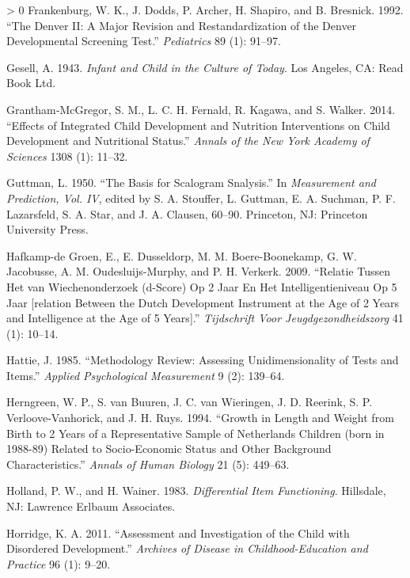 \documentclass[
]{book}
\newlength{\cslhangindent}
\newenvironment{CSLReferences}[3] %
 {%
  \setlength{\parindent}{0pt}
  \ifodd #1 \everypar{\setlength{\hangindent}{\cslhangindent}}\ignorespaces\fi
  \ifnum #2 > 0
  \setlength{\parskip}{#2\baselineskip}
  \fi
 }%
 {}
\begin{document}
\begin{CSLReferences}{1}{0}
\leavevmode\hypertarget{ref-frankenburg1992}{}%
Frankenburg, W. K., J. Dodds, P. Archer, H. Shapiro, and B. Bresnick. 1992. {``The Denver II: A Major Revision and Restandardization of the Denver Developmental Screening Test.''} \emph{Pediatrics} 89 (1): 91--97.

\leavevmode\hypertarget{ref-gesell1943}{}%
Gesell, A. 1943. \emph{Infant and Child in the Culture of Today}. Los Angeles, CA: Read Book Ltd.

\leavevmode\hypertarget{ref-grantham2014}{}%
Grantham‐McGregor, S. M., L. C. H. Fernald, R. Kagawa, and S. Walker. 2014. {``Effects of Integrated Child Development and Nutrition Interventions on Child Development and Nutritional Status.''} \emph{Annals of the New York Academy of Sciences} 1308 (1): 11--32.

\leavevmode\hypertarget{ref-guttman1950}{}%
Guttman, L. 1950. {``The Basis for Scalogram Snalysis.''} In \emph{Measurement and Prediction, Vol. IV}, edited by S. A. Stouffer, L. Guttman, E. A. Suchman, P. F. Lazarsfeld, S. A. Star, and J. A. Clausen, 60--90. Princeton, NJ: Princeton University Press.

\leavevmode\hypertarget{ref-hafkamp2009}{}%
Hafkamp-de Groen, E., E. Dusseldorp, M. M. Boere-Boonekamp, G. W. Jacobusse, A. M. Oudesluijs-Murphy, and P. H. Verkerk. 2009. {``Relatie Tussen Het van Wiechenonderzoek (d-Score) Op 2 Jaar En Het Intelligentieniveau Op 5 Jaar {[}relation Between the Dutch Development Instrument at the Age of 2 Years and Intelligence at the Age of 5 Years{]}.''} \emph{Tijdschrift Voor Jeugdgezondheidszorg} 41 (1): 10--14.

\leavevmode\hypertarget{ref-hattie1985}{}%
Hattie, J. 1985. {``Methodology Review: Assessing Unidimensionality of Tests and Items.''} \emph{Applied Psychological Measurement} 9 (2): 139--64.

\leavevmode\hypertarget{ref-herngreen1994}{}%
Herngreen, W. P., S. van Buuren, J. C. van Wieringen, J. D. Reerink, S. P. Verloove-Vanhorick, and J. H. Ruys. 1994. {``Growth in Length and Weight from Birth to 2 Years of a Representative Sample of Netherlands Children (born in 1988-89) Related to Socio-Economic Status and Other Background Characteristics.''} \emph{Annals of Human Biology} 21 (5): 449--63.

\leavevmode\hypertarget{ref-holland1983}{}%
Holland, P. W., and H. Wainer. 1983. \emph{Differential Item Functioning}. Hillsdale, NJ: Lawrence Erlbaum Associates.

\leavevmode\hypertarget{ref-horridge2011}{}%
Horridge, K. A. 2011. {``Assessment and Investigation of the Child with Disordered Development.''} \emph{Archives of Disease in Childhood-Education and Practice} 96 (1): 9--20.


\end{CSLReferences}
\end{document}
